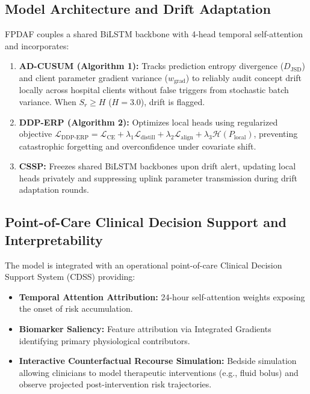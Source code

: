 \documentclass[11pt,a4paper]{article}
\begin{document}
\subsection{Model Architecture and Drift Adaptation}
FPDAF couples a shared BiLSTM backbone with 4-head temporal self-attention and incorporates:
\begin{enumerate}
    \item \textbf{AD-CUSUM (Algorithm 1):} Tracks prediction entropy divergence ($D_{\text{JSD}}$) and client parameter gradient variance ($w_{\text{grad}}$) to reliably audit concept drift locally across hospital clients without false triggers from stochastic batch variance. When $S_r \ge H$ ($H=3.0$), drift is flagged.
    \item \textbf{DDP-ERP (Algorithm 2):} Optimizes local heads using regularized objective $\mathcal{L}_{\text{DDP-ERP}} = \mathcal{L}_{\text{CE}} + \lambda_1 \mathcal{L}_{\text{distill}} + \lambda_2 \mathcal{L}_{\text{align}} + \lambda_3 \mathcal{H}(P_{\text{local}})$, preventing catastrophic forgetting and overconfidence under covariate shift.
    \item \textbf{CSSP:} Freezes shared BiLSTM backbones upon drift alert, updating local heads privately and suppressing uplink parameter transmission during drift adaptation rounds.
\end{enumerate}

\subsection{Point-of-Care Clinical Decision Support and Interpretability}
The model is integrated with an operational point-of-care Clinical Decision Support System (CDSS) providing:
\begin{itemize}
    \item \textbf{Temporal Attention Attribution:} 24-hour self-attention weights exposing the onset of risk accumulation.
    \item \textbf{Biomarker Saliency:} Feature attribution via Integrated Gradients identifying primary physiological contributors.
    \item \textbf{Interactive Counterfactual Recourse Simulation:} Bedside simulation allowing clinicians to model therapeutic interventions (e.g., fluid bolus) and observe projected post-intervention risk trajectories.
\end{itemize}
\end{document}
